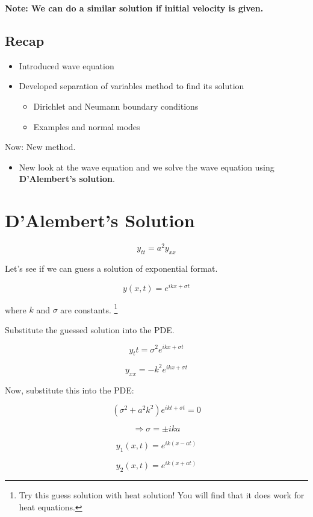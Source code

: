 \documentclass{article}
\begin{document}
\textbf{Note: We can do a similar solution if initial velocity is given. }

\subsection{Recap}

\begin{itemize}
    \item Introduced wave equation
    \item Developed separation of variables method to find its solution
    \begin{itemize}
        \item Dirichlet and Neumann boundary conditions
        \item Examples and normal modes
    \end{itemize}
\end{itemize}

Now: New method. 

\begin{itemize}
    \item New look at the wave equation and we solve the wave equation using \textbf{D'Alembert's solution}. 
\end{itemize}

\section{D'Alembert's Solution}

$$y_{tt} = a^2 y_{xx}$$

Let's see if we can guess a solution of exponential format. 

$$y(x,t) = e^{i k x + \sigma t}$$

where $k$ and $\sigma$ are constants. \footnote{Try this guess solution with heat solution! You will find that it does work for heat equations. }

Substitute the guessed solution into the PDE. 

$$y_tt = \sigma^2 e^{i k x + \sigma t}$$

$$y_{xx} = - k^2 e^{i k x + \sigma t}$$

Now, substitute this into the PDE:

$$\left(\sigma^2 + a^2 k^2 \right) e^{i k t + \sigma t} = 0$$

$$\Rightarrow \sigma = \pm i k a$$

$$y_1 (x,t) = e^{i k (x - at)}$$

$$y_2(x,t) = e^{i k(x + at)}$$
\end{document}
